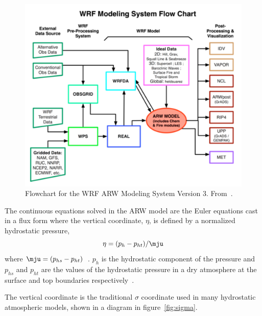 \begin{figure}
\centering
\includegraphics[width=\textwidth]{wrfflowchart}
\caption{Flowchart for the WRF ARW Modeling System Version 3. From~\cite{Wang2015}.}
\label{fig:wrfflowchart}
\end{figure}


The continuous equations solved in the ARW model are the Euler equations cast in a flux form where the vertical coordinate, $\eta$, is defined by a normalized hydrostatic pressure,
\begin{equation}
\eta = (p_h - p_{ht})/\mju 
\end{equation}
where $\mju = (p_{hs} - p_{ht})$~\citep{Skamarock2008}. $p_h$ is the hydrostatic component of the pressure and $p_{hs}$ and $p_{ht}$ are the values of the hydrostatic pressure in a dry atmosphere at the surface and top boundaries respectively~\citep{Skamarock2008}.

The vertical coordinate is the traditional $\sigma$ coordinate used in many hydrostatic atmospheric models, shown in a diagram in figure~\ref{fig:sigma}.

